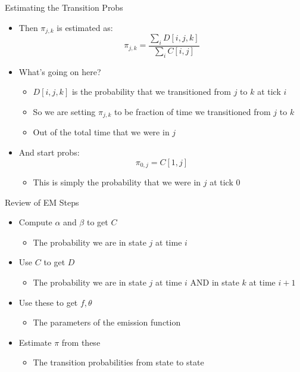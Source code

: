 \documentclass[aspectratio=169]{beamer}
\begin{document}

\begin{frame}{Estimating the Transition Probs}

\begin{itemize}
\item Then $\pi_{j,k}$  is estimated as:
	$$\pi_{j,k} = \frac{\sum_i D[i,j,k]} {\sum_i C[i,j]}$$
\item What's going on here?
	\begin{itemize}
	\item $D[i,j,k]$ is the probability that we transitioned from $j$ to $k$ at tick $i$
	\item So we are setting $\pi_{j,k}$ to be fraction of time we transitioned from $j$ to $k$
	\item Out of the total time that we were in $j$
	\end{itemize}
\item And start probs:
	$$\pi_{0,j} = C[1,j]$$
	\begin{itemize}
	\item This is simply the probability that we were in $j$ at tick 0
	\end{itemize}
\end{itemize}
\end{frame}

\begin{frame}{Review of EM Steps}

\begin{itemize}
\item Compute $\alpha$ and $\beta$ to get $C$
\begin{itemize}
\item The probability we are in state $j$ at time $i$
\end{itemize}

\item Use $C$ to get $D$
\begin{itemize}
\item The probability we are in state $j$ at time $i$ AND in state $k$ at time $i+1$
\end{itemize}
\item Use these to get $f, \theta$
\begin{itemize}
\item The parameters of the emission function
\end{itemize}
\item Estimate $\pi$ from these
 \begin{itemize}
\item The transition probabilities from state to state
\end{itemize}
\end{itemize}
\end{frame}
\end{document}

